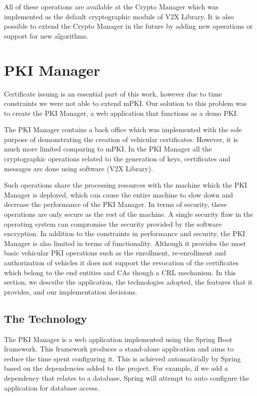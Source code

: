 All of these operations are available at the Crypto Manager which was implemented as the default cryptographic module of V2X Library. It is also possible to extend the Crypto Manager in the future by adding new operations or support for new algorithms.


\section{PKI Manager}
Certificate issuing is an essential part of this work, however due to time constraints we were not able to extend mPKI. Our solution to this problem was to create the PKI Manager, a web application that functions as a demo PKI. 

The PKI Manager contains a back office which was implemented with the sole purpose of demonstrating the creation of vehicular certificates. However, it is much more limited comparing to mPKI. In the PKI Manager all the cryptographic operations related to the generation of keys, certificates and messages are done using software (V2X Library). 

Such operations share the processing resources with the machine which the PKI Manager is deployed, which can cause the entire machine to slow down and decrease the performance of the PKI Manager. In terms of security, these operations are only secure as the rest of the machine. A single security flaw in the operating system can compromise the security provided by the software encryption. In addition to the constraints in performance and security, the PKI Manager is also limited in terms of functionality. Although it provides the most basic vehicular PKI operations such as the enrollment, re-enrollment and authorization of vehicles it does not support the revocation of the certificates which belong to the end entities and CAs though a CRL mechanism. In this section, we describe the application, the technologies adopted, the features that it provides, and our implementation decisions.

\subsection{The Technology}
The PKI Manager is a web application implemented using the Spring Boot framework. This framework produces a stand-alone application and aims to reduce the time spent configuring it. This is achieved automatically by Spring based on the dependencies added to the project. For example, if we add a dependency that relates to a database, Spring will attempt to auto configure the application for database access.

